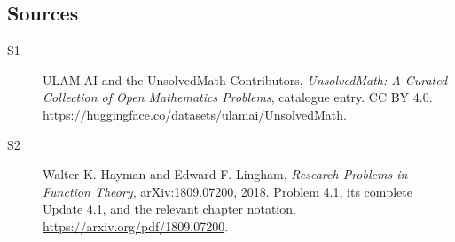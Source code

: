 \documentclass[11pt]{book}
\begin{document}
\subsection{Sources}
\begin{description}
\item[\hypertarget{source:statement:1}{S1}] ULAM.AI and the UnsolvedMath Contributors, \emph{UnsolvedMath: A Curated Collection of Open Mathematics Problems}, catalogue entry. CC BY 4.0. \url{https://huggingface.co/datasets/ulamai/UnsolvedMath}.
\item[\hypertarget{source:statement:2}{S2}] Walter K. Hayman and Edward F. Lingham, \emph{Research Problems in Function Theory}, arXiv:1809.07200, 2018. Problem 4.1, its complete Update 4.1, and the relevant chapter notation. \url{https://arxiv.org/pdf/1809.07200}.
\end{description}
\label{end:statement}
\end{document}
